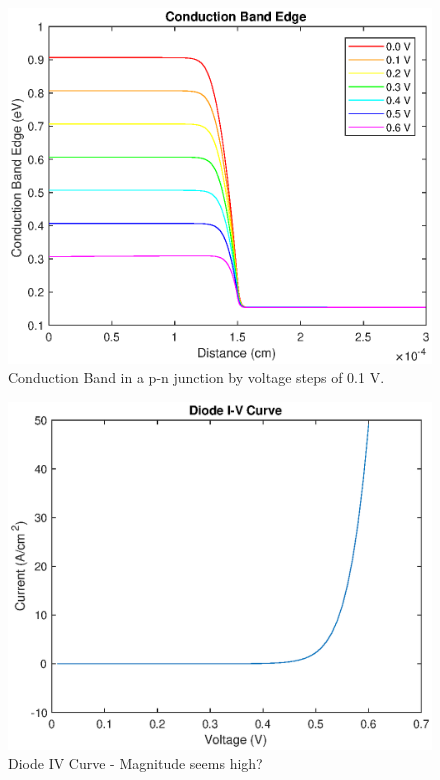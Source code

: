 \documentclass[12pt]{article}
\begin{document}
\begin{figure}
	\centering
	\includegraphics{CondBandEdgeByVoltage}
	\caption{Conduction Band in a p-n junction by voltage steps of 0.1 V. }
\end{figure} 

\begin{figure}
	\centering
	\includegraphics{DiodeIV}
	\caption{Diode IV Curve - Magnitude seems high?}
\end{figure} 



\end{document}
